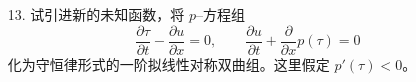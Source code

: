 \begin{itemize}
\begin{proof}
记
\[
\xi=
\left(
\frac{1}{\eta_0},
\frac{\eta_1}{\eta_0},
\ldots,
\frac{\eta_n}{\eta_0}
\right),
\qquad
\bar\xi=
\left(
\frac{1}{\bar\eta_0},
\frac{\bar\eta_1}{\bar\eta_0},
\ldots,
\frac{\bar\eta_n}{\bar\eta_0}
\right).
\]
由于上述变量变换是一一对应的，$\eta\neq\bar\eta$ 蕴含
$\xi\neq\bar\xi$。

设 $\xi^{(t)}$ 是与 $\eta^{(t)}$ 对应的 $\xi$ 变量。直接计算可得
\begin{align*}
\xi_0^{(t)}
&=
\frac{1}{d}
=
\alpha\xi_0+\beta\bar\xi_0,\\
\xi_i^{(t)}
&=
\frac{(1-t)\eta_i+t\bar\eta_i}{d}\\
&=
\alpha\xi_i+\beta\bar\xi_i.
\end{align*}
因此
\[
\xi^{(t)}=\alpha\xi+\beta\bar\xi.
\]

利用 $L$ 的严格凸性以及 $\xi\neq\bar\xi$，得到
\[
L\bigl(\xi^{(t)}\bigr)
<
\alpha L(\xi)+\beta L(\bar\xi).
\]
两边乘以 $d>0$，便有
\begin{align*}
M\bigl((1-t)\eta+t\bar\eta\bigr)
&=
dL\bigl(\xi^{(t)}\bigr)\\
&<
d\bigl[\alpha L(\xi)+\beta L(\bar\xi)\bigr]\\
&=
(1-t)\eta_0L(\xi)
+t\bar\eta_0L(\bar\xi)\\
&=
(1-t)M(\eta)+tM(\bar\eta).
\end{align*}
所以 $M$ 关于变量
$\eta_0,\eta_1,\ldots,\eta_n$ 是严格凸函数。
\end{proof}


    \item[13.]试引进新的未知函数，将 $p$--方程组
    $$
    \frac{\partial\tau}{\partial t}
    -\frac{\partial u}{\partial x}=0,\qquad
    \frac{\partial u}{\partial t}
    +\frac{\partial}{\partial x}p(\tau)=0
    $$
    化为守恒律形式的一阶拟线性对称双曲组。这里假定 $p'(\tau)<0$。


\end{itemize}
